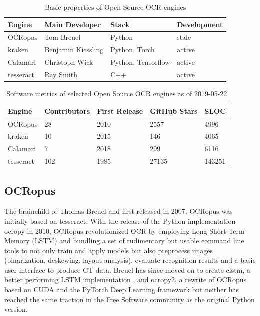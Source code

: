 \documentclass[conference]{IEEEtran}
\begin{document}
\begin{table}[b]
\begin{tabular}{llll}
\hline
Engine    & Main Developer     & Stack                      & Development \\ \hline
OCRopus   & Tom Breuel         & Python                     & stale       \\
kraken    & Benjamin Kiessling & Python, Torch              & active      \\
Calamari  & Christoph Wick     & Python, Tensorflow         & active      \\
tesseract & Ray Smith          & C++                        & active
\end{tabular}
\caption{Basic properties of Open Source OCR engines}
\label{tab:basic}
\end{table}

\begin{table}[b]
\begin{tabular}{lllll}
\hline
Engine    & Contributors & First Release & GitHub Stars & SLOC \\ \hline
OCRopus   & 28           & 2010          & 2557         & 4996 \\
kraken    & 10           & 2015          & 146          & 4065 \\
Calamari  & 7            & 2018          & 299          & 6116 \\
tesseract & 102          & 1985          & 27135        & 143251 \\

\end{tabular}
\caption{Software metrics of selected Open Source OCR engines as of 2019-05-22}
\label{tab:stats}
\end{table}

\subsection*{OCRopus}

The brainchild of Thomas Breuel and first released in 2007, OCRopus \cite{breuel} was
initially based on tesseract. With the release of the Python implementation ocropy in
2010, OCRopus revolutionized OCR by employing Long-Short-Term-Memory (LSTM) and
bundling a set of rudimentary but usable command line tools to not only train and
apply models but also preprocess images (binarization, deskewing, layout analysis),
evaluate recognition results and a basic user interface to produce GT data. Breuel
has since moved on to create clstm, a better performing LSTM implementation 
\cite{DBLP:conf/icdar/Breuel17}, and ocropy2, a rewrite of OCRopus based on CUDA and
the PyTorch Deep Learning framework \cite{DBLP:conf/icdar/Breuel17} but neither
has reached the same traction in the Free Software community as the original Python version.
\end{document}
